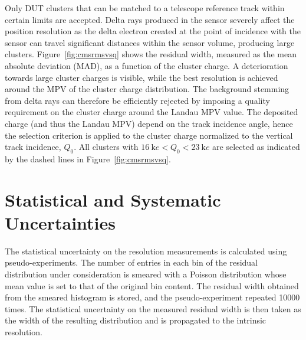 \documentclass[a4paper,11pt]{article}
\begin{document}
Only DUT clusters that can be matched to a telescope reference track within certain limits are accepted.
Delta rays produced in the sensor severely affect the position resolution as the delta electron created at the point of incidence with the sensor can travel significant distances within the sensor volume, producing large clusters.
Figure~\ref{fig:cmsrmsvsq} shows the residual width, measured as the mean absolute deviation (MAD), as a function of the cluster charge.
A deterioration towards large cluster charges is visible, while the best resolution is achieved around the MPV of the cluster charge distribution.
The background stemming from delta rays can therefore be efficiently rejected by imposing a quality requirement on the cluster charge around the Landau MPV value.
The deposited charge (and thus the Landau MPV) depend on the track incidence angle, hence the selection criterion is applied to the cluster charge normalized to the vertical track incidence, $Q_0$.
All clusters with $\SI{16}{\kilo e} < Q_0 < \SI{23}{\kilo e}$ are selected as indicated by the dashed lines in Figure~\ref{fig:cmsrmsvsq}.


\section{Statistical and Systematic Uncertainties}
\label{sec:uncertainties}

The statistical uncertainty on the resolution measurements is calculated using pseudo-experiments.
The number of entries in each bin of the residual distribution under consideration is smeared with a Poisson distribution
whose mean value is set to that of the original bin content.
The residual width obtained from the smeared histogram is stored, and the pseudo-experiment repeated \num{10000} times.
The statistical uncertainty on the measured residual width is then taken as the width of the resulting distribution and is propagated to the intrinsic resolution.
\end{document}
